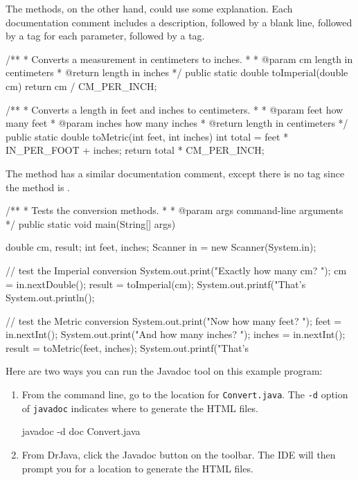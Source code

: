 The methods, on the other hand, could use some explanation.
Each documentation comment includes a description, followed by a blank line, followed by a  tag for each parameter, followed by a  tag.

\begin{code}
/**
 * Converts a measurement in centimeters to inches.
 *
 * @param cm length in centimeters
 * @return length in inches
 */
public static double toImperial(double cm) {
    return cm / CM_PER_INCH;
}

/**
 * Converts a length in feet and inches to centimeters.
 *
 * @param feet how many feet
 * @param inches how many inches
 * @return length in centimeters
 */
public static double toMetric(int feet, int inches) {
    int total = feet * IN_PER_FOOT + inches;
    return total * CM_PER_INCH;
}
\end{code}

The  method has a similar documentation comment, except there is no  tag since the method is .

\begin{code}
/**
 * Tests the conversion methods.
 *
 * @param args command-line arguments
 */
public static void main(String[] args) {
    double cm, result;
    int feet, inches;
    Scanner in = new Scanner(System.in);

    // test the Imperial conversion
    System.out.print("Exactly how many cm? ");
    cm = in.nextDouble();
    result = toImperial(cm);
    System.out.printf("That's %
    System.out.println();

    // test the Metric conversion
    System.out.print("Now how many feet? ");
    feet = in.nextInt();
    System.out.print("And how many inches? ");
    inches = in.nextInt();
    result = toMetric(feet, inches);
    System.out.printf("That's %
}
\end{code}

Here are two ways you can run the Javadoc tool on this example program:

\begin{enumerate}


\item From the command line, go to the location for {\tt Convert.java}.
The {\tt -d} option of {\tt javadoc} indicates where to generate the HTML files.

\begin{stdout}
javadoc -d doc Convert.java
\end{stdout}

\item From DrJava, click the {\sf Javadoc} button on the toolbar.
The IDE will then prompt you for a location to generate the HTML files.
\end{enumerate}

